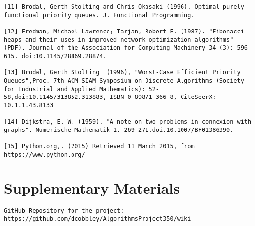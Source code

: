\documentclass{article}
\begin{document}
\begin{lstlisting}
[11] Brodal, Gerth Stolting and Chris Okasaki (1996). Optimal purely functional priority queues. J. Functional Programming.

[12] Fredman, Michael Lawrence; Tarjan, Robert E. (1987). "Fibonacci heaps and their uses in improved network optimization algorithms"(PDF). Journal of the Association for Computing Machinery 34 (3): 596-615. doi:10.1145/28869.28874.

[13] Brodal, Gerth Stolting  (1996), "Worst-Case Efficient Priority Queues",Proc. 7th ACM-SIAM Symposium on Discrete Algorithms (Society for Industrial and Applied Mathematics): 52-58,doi:10.1145/313852.313883, ISBN 0-89871-366-8, CiteSeerX: 10.1.1.43.8133

[14] Dijkstra, E. W. (1959). "A note on two problems in connexion with graphs". Numerische Mathematik 1: 269-271.doi:10.1007/BF01386390.

[15] Python.org,. (2015) Retrieved 11 March 2015, from https://www.python.org/

\end{lstlisting}

\section{Supplementary Materials}
\begin{verbatim}
GitHub Repository for the project:
https://github.com/dcobbley/AlgorithmsProject350/wiki
\end{verbatim}
\end{document}
